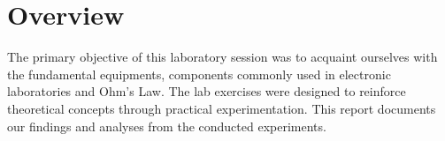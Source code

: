 \chapter{Overview}
The primary objective of this laboratory session was to acquaint ourselves with the fundamental equipments, components commonly used in electronic laboratories and Ohm's Law. The lab exercises were designed to reinforce theoretical concepts through practical experimentation. This report documents our findings and analyses from the conducted experiments.

